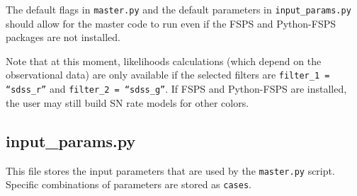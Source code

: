 \documentclass[manuscript]{aastex}
\begin{document}
The default flags in \texttt{master.py} and the default parameters in 
\texttt{input\_params.py} should allow for the master code to run even if the FSPS and Python-FSPS packages are not installed.

Note that at this moment, likelihoods calculations (which depend on the observational data) are only available if the selected filters are \texttt{filter\_1 = ``sdss\_r''} and \texttt{filter\_2 = ``sdss\_g''}. If FSPS and Python-FSPS are installed, the user may still build SN rate models for other colors.

\subsection{input\_params.py}
\label{subsec:input}

This file stores the input parameters that are used by the \texttt{master.py} script. Specific combinations of parameters are stored as \texttt{cases}.
\end{document}
